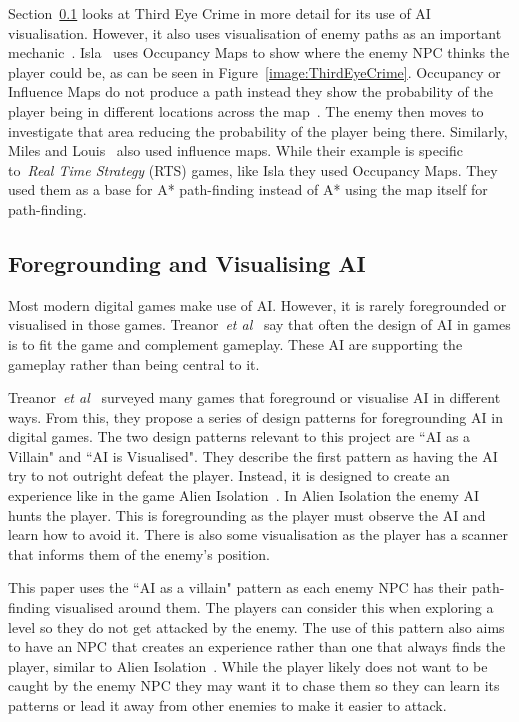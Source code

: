 \documentclass[journal]{IEEEtran}
\begin{document}
	Section~\ref{VisualisingAI} looks at Third Eye Crime in more detail for its use of AI visualisation. However, it also uses visualisation of enemy paths as an important mechanic~\cite{Isla2014, game:ThirdEyeCrime}.  Isla~\cite{Isla2014} uses Occupancy Maps to show where the enemy NPC thinks the player could be, as can be seen in Figure~\ref{image:ThirdEyeCrime}. Occupancy or Influence Maps do not produce a path instead they show the probability of the player being in different locations across the map~\cite{Isla2014, Miles2006}. The enemy then moves to investigate that area reducing the probability of the player being there.  Similarly, Miles and Louis~\cite{Miles2006} also used influence maps. While their example is specific to~\textit{Real Time Strategy} (RTS) games, like Isla they used Occupancy Maps.  They used them as a base for A* path-finding instead of A* using the map itself for path-finding.
	
	
	\subsection{Foregrounding and Visualising AI} \label{VisualisingAI}
	Most modern digital games make use of AI.  However, it is rarely foregrounded or visualised in those games. Treanor~\textit{et al}~\cite{treanor2015} say that often the design of AI in games is to fit the game and complement gameplay. These AI are supporting the gameplay rather than being central to it.
	
	Treanor~\textit{et al}~\cite{treanor2015} surveyed many games that foreground or visualise AI in different ways.   From this, they propose a series of design patterns for foregrounding AI in digital games. 
	The two design patterns relevant to this project are ``AI as a Villain" and ``AI is Visualised".  They describe the first pattern as having the AI try to not outright defeat the player. Instead, it is designed to create an experience like in the game Alien Isolation~\cite{treanor2015, game:AlienIsolation}.  In Alien Isolation the enemy AI hunts the player. This is foregrounding as the player must observe the AI and learn how to avoid it. There is also some visualisation as the player has a scanner that informs them of the enemy's position. 
	
	This paper uses the ``AI as a villain" pattern as each enemy NPC has their path-finding visualised around them. The players can consider this when exploring a level so they do not get attacked by the enemy. The use of this pattern also aims to have an NPC that creates an experience rather than one that always finds the player, similar to Alien Isolation~\cite{game:AlienIsolation,treanor2015}. While the player likely does not want to be caught by the enemy NPC they may want it to chase them so they can learn its patterns or lead it away from other enemies to make it easier to attack. 
	
\end{document}
